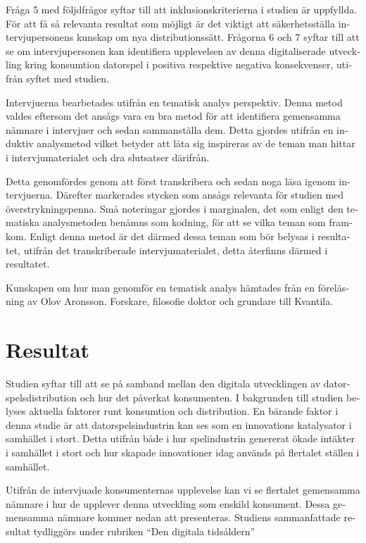 \documentclass[11p]{article}
\begin{document}
\begin{otherlanguage}{swedish}
    Fråga 5 med följdfrågor syftar till att inklusionskriterierna i studien är uppfyllda. För att få så relevanta resultat som möjligt är det viktigt att säkerhetsställa intervjupersonens kunskap om nya distributionssätt.
    Frågorna 6 och 7 syftar till att se om intervjupersonen kan identifiera upplevelsen av denna digitaliserade utveckling kring konsumtion datorspel i  positiva respektive negativa konsekvenser, utifrån syftet med studien.

    Intervjuerna bearbetades utifrån en tematisk analys perspektiv. Denna metod valdes eftersom det ansågs vara en bra metod för att identifiera gemensamma nämnare i intervjuer och sedan sammanställa dem. Detta gjordes utifrån en induktiv analysmetod vilket betyder att låta sig inspireras av de teman man hittar i intervjumaterialet och dra slutsatser därifrån.

    Detta genomfördes genom att först transkribera och sedan noga läsa igenom intervjuerna. Därefter markerades stycken som ansågs relevanta för studien med överstrykningspenna. Små noteringar gjordes i marginalen, det som enligt den tematiska analysmetoden benämns som kodning, för att se vilka teman som framkom. Enligt denna metod är det därmed  dessa teman som bör belysas i resultatet, utifrån det transkriberade intervjumaterialet, detta återfinns därmed i resultatet.

    Kunskapen om hur man genomför en tematisk analys hämtades från en föreläsning av Olov Aronsson. Forskare, filosofie doktor och grundare till Kvantila.\parencite{tematisk}


    \section{Resultat}

    Studien syftar till att se på samband mellan den digitala utvecklingen av datorspelsdistribution och hur det påverkat konsumenten. I bakgrunden till studien belyses aktuella faktorer runt konsumtion och distribution.  En bärande faktor i denna studie är att datorspelsindustrin kan ses som en innovations katalysator i samhället i stort. Detta utifrån både i hur spelindustrin genererat ökade intäkter i samhället i stort och hur skapade innovationer idag används på flertalet ställen i samhället.

    Utifrån de intervjuade konsumenternas upplevelse kan vi se flertalet gemensamma nämnare i hur de upplever denna utveckling som enskild konsument. Dessa gemensamma nämnare kommer nedan att presenteras. Studiens sammanfattade resultat tydliggörs under rubriken “Den digitala tidsåldern”


\end{otherlanguage}
\end{document}
